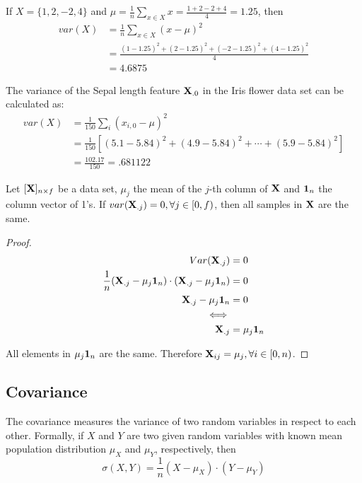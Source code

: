 \begin{example}
	If $X=\{1, 2, -2, 4\}$ and $\mu = \frac{1}{n} \sum_{x \in X} x = \frac{1+2-2+4}{4} = 1.25$, then
	\begin{align*}
	var(X) &= \frac{1}{n} \sum_{x \in X} (x - \mu)^2 \\
	&= \frac{(1-1.25)^2 + (2-1.25)^2 + (-2-1.25)^2 + (4-1.25)^2}{4} \\
	&= 4.6875
	\end{align*}
\end{example}

\begin{example}
	The variance of the Sepal length feature $\mathbf{X}_{.0}$ in the Iris flower data set can be calculated as:
	\begin{align*}
	var(X) &= \frac{1}{150} \sum_i (x_{i,0} - \mu)^2 \\
	&= \frac{1}{150} [(5.1-5.84)^2 + (4.9-5.84)^2 + \cdots + (5.9-5.84)^2] \\
	&= \frac{102.17}{150} = .681122
	\end{align*}
\end{example}

Let $[\mathbf{X}]_{n \times f}$ be a data set, $\mu_j$ the mean of the $j$-th column of $\mathbf{X}$ and $\mathbf{1}_n$ the column vector of 1's. If $var(\mathbf{X}_{.j}) = 0, \forall j \in [0, f)$, then all samples in $\mathbf{X}$ are the same.
\begin{proof}
	\begin{align*}
	Var(\mathbf{X}_{.j}) &= 0 \\
	\frac{1}{n} (\mathbf{X}_{.j} - \mu_j \mathbf{1}_n) \cdot (\mathbf{X}_{.j} - \mu_j \mathbf{1}_n) &= 0 \\
	\mathbf{X}_{.j} - \mu_j \mathbf{1}_n &= 0  \\
	\iff& \\
	\mathbf{X}_{.j} &= \mu_j \mathbf{1}_n
	\end{align*}
	
	All elements in $\mu_j \mathbf{1}_n$ are the same. Therefore $\mathbf{X}_{ij} = \mu_j, \forall i \in [0, n)$.
\end{proof}

\subsection{Covariance}

The covariance measures the variance of two random variables in respect to each other. Formally, if $X$ and $Y$ are two given random variables with known mean population distribution $\mu_X$ and $\mu_Y$, respectively, then
$$\sigma(X, Y) = \frac{1}{n} (X - \mu_X) \cdot (Y - \mu_Y) $$

